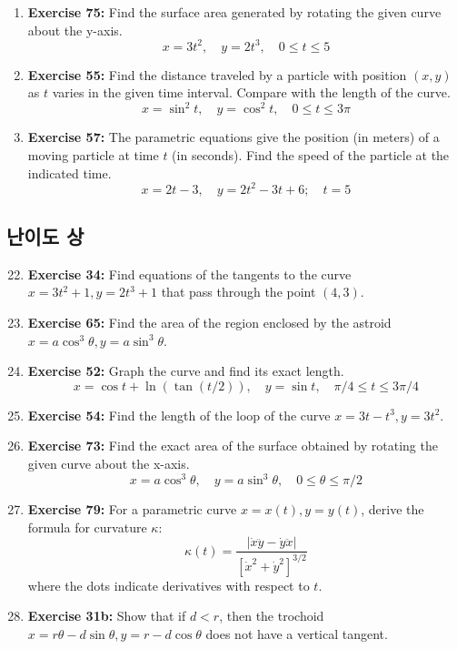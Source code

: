\documentclass[12pt, a4paper]{article}
\begin{document}
\begin{enumerate}
    \item \textbf{Exercise 75:} Find the surface area generated by rotating the given curve about the y-axis.
    \[ x=3t^2, \quad y=2t^3, \quad 0 \le t \le 5 \]
    
    \item \textbf{Exercise 55:} Find the distance traveled by a particle with position $(x, y)$ as $t$ varies in the given time interval. Compare with the length of the curve.
    \[ x = \sin^2 t, \quad y = \cos^2 t, \quad 0 \le t \le 3\pi \]
    
    \item \textbf{Exercise 57:} The parametric equations give the position (in meters) of a moving particle at time $t$ (in seconds). Find the speed of the particle at the indicated time.
    \[ x = 2t-3, \quad y = 2t^2-3t+6; \quad t=5 \]
\end{enumerate}

\hrulefill
\vspace{1em}

\subsection*{난이도 상}

\begin{enumerate}
    \setcounter{enumi}{21}
    \item \textbf{Exercise 34:} Find equations of the tangents to the curve $x=3t^2+1, y=2t^3+1$ that pass through the point $(4,3)$.
    
    \item \textbf{Exercise 65:} Find the area of the region enclosed by the astroid $x=a\cos^3\theta, y=a\sin^3\theta$.
    
    \item \textbf{Exercise 52:} Graph the curve and find its exact length.
    \[ x = \cos t + \ln(\tan(t/2)), \quad y=\sin t, \quad \pi/4 \le t \le 3\pi/4 \]
    
    \item \textbf{Exercise 54:} Find the length of the loop of the curve $x=3t-t^3, y=3t^2$.
    
    \item \textbf{Exercise 73:} Find the exact area of the surface obtained by rotating the given curve about the x-axis.
    \[ x = a\cos^3\theta, \quad y=a\sin^3\theta, \quad 0 \le \theta \le \pi/2 \]
    
    \item \textbf{Exercise 79:} For a parametric curve $x=x(t), y=y(t)$, derive the formula for curvature $\kappa$:
    \[ \kappa(t) = \frac{|\dot{x}\ddot{y} - \dot{y}\ddot{x}|}{[\dot{x}^2 + \dot{y}^2]^{3/2}} \]
    where the dots indicate derivatives with respect to $t$.
    
    \item \textbf{Exercise 31b:} Show that if $d < r$, then the trochoid $x=r\theta - d\sin\theta, y=r-d\cos\theta$ does not have a vertical tangent.
\end{enumerate}
\end{document}
